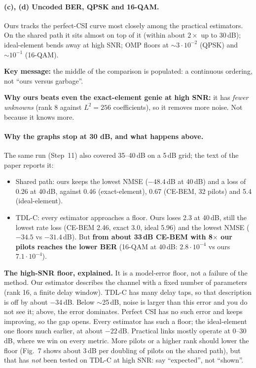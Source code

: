 \documentclass[11pt,a4paper]{article}
\begin{document}
\paragraph{(c), (d) Uncoded BER, QPSK and 16-QAM.} Ours tracks the perfect-CSI curve most closely among the practical
estimators. On the shared path it sits almost on top of it (within about $2\times$ up to 30\,dB); ideal-element bends away at
high SNR; OMP floors at $\sim3\cdot10^{-2}$ (QPSK) and $\sim10^{-1}$ (16-QAM).

\textbf{Key message:} the middle of the comparison is populated: a continuous ordering, not ``ours versus garbage''.
\begin{keybox}
\textbf{Why ours beats even the exact-element genie at high SNR:} it has \emph{fewer unknowns} (rank 8 against $L^2=256$
coefficients), so it removes more noise. Not because it knows more.
\end{keybox}

\paragraph{Why the graphs stop at 30 dB, and what happens above.} The same run (Step~11) also covered 35--40\,dB on a 5\,dB
grid; the text of the paper reports it:
\begin{itemize}
\item Shared path: ours keeps the lowest NMSE ($-48.4$\,dB at 40\,dB) and a loss of 0.26 at 40\,dB, against 0.46
(exact-element), 0.67 (CE-BEM, 32 pilots) and 5.4 (ideal-element).
\item TDL-C: every estimator approaches a floor. Ours loses 2.3 at 40\,dB, still the lowest rate loss (CE-BEM 2.46,
exact 3.0, ideal 5.96) and the lowest NMSE ($-34.5$ vs $-31.4$\,dB). But \textbf{from about 33\,dB CE-BEM with 8$\times$ our
pilots reaches the lower BER} (16-QAM at 40\,dB: $2.8\cdot10^{-4}$ vs ours $7.1\cdot10^{-4}$).
\end{itemize}
\begin{warnbox}
\textbf{The high-SNR floor, explained.} It is a model-error floor, not a failure of the method. Our estimator describes the
channel with a fixed number of parameters (rank 16, a finite delay window). TDL-C has many delay taps, so that description
is off by about $-34$\,dB. Below $\sim$25\,dB, noise is larger than this error and you do not see it; above, the error
dominates. Perfect CSI has no such error and keeps improving, so the gap opens. Every estimator has such a floor; the
ideal-element one floors much earlier, at about $-22$\,dB. Practical links mostly operate at 0--30\,dB, where we win on
every metric. More pilots or a higher rank should lower the floor (Fig.~7 shows about 3\,dB per doubling of pilots on the
shared path), but that has \emph{not} been tested on TDL-C at high SNR: say ``expected'', not ``shown''.
\end{warnbox}
\end{document}
